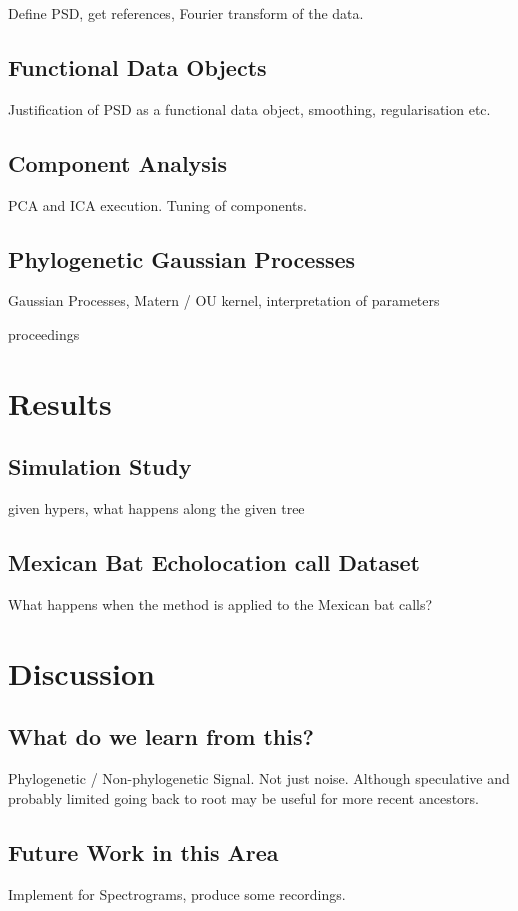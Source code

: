 \documentclass{ws-rv9x6}
\begin{document}
Define PSD, get references, Fourier transform of the data.

\subsection{Functional Data Objects}

Justification of PSD as a functional data object, smoothing, regularisation etc.

\subsection{Component Analysis}

PCA and ICA execution. Tuning of components.

\subsection{Phylogenetic Gaussian Processes}

Gaussian Processes, Matern / OU kernel, interpretation of parameters

proceedings 

\section{Results}

\subsection{Simulation Study}

given hypers, what happens along the given tree

\subsection{Mexican Bat Echolocation call Dataset}

What happens when the method is applied to the Mexican bat calls?

\section{Discussion}

\subsection{What do we learn from this?}

Phylogenetic / Non-phylogenetic Signal. Not just noise. Although speculative and probably limited going back to root may be useful for more recent ancestors.

\subsection{Future Work in this Area}

Implement for Spectrograms, produce some recordings.





\end{document}
